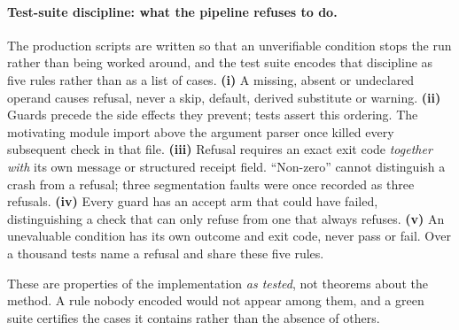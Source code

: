 
\paragraph{Test-suite discipline: what the pipeline refuses to do.} The production scripts are written so that an unverifiable condition stops the run rather than being worked around, and the test suite encodes that discipline as five rules rather than as a list of cases. \textbf{(i)} A missing, absent or undeclared operand causes refusal, never a skip, default, derived substitute or warning. \textbf{(ii)} Guards precede the side effects they prevent; tests assert this ordering. The motivating module import above the argument parser once killed every subsequent check in that file. \textbf{(iii)} Refusal requires an exact exit code \emph{together with} its own message or structured receipt field. ``Non-zero'' cannot distinguish a crash from a refusal; three segmentation faults were once recorded as three refusals. \textbf{(iv)} Every guard has an accept arm that could have failed, distinguishing a check that can only refuse from one that always refuses. \textbf{(v)} An unevaluable condition has its own outcome and exit code, never pass or fail. Over a thousand tests name a refusal and share these five rules.

\noindent These are properties of the implementation \emph{as tested}, not theorems about the method. A rule nobody encoded would not appear among them, and a green suite certifies the cases it contains rather than the absence of others.
